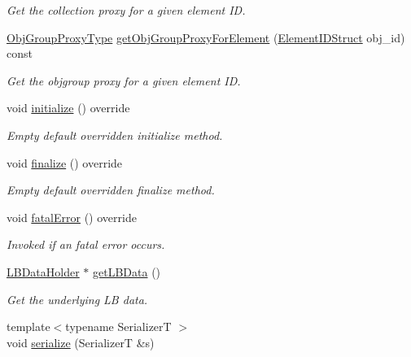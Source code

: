 \begin{DoxyCompactItemize}
\begin{DoxyCompactList}\small\item\em Get the collection proxy for a given element ID. \end{DoxyCompactList}\item 
\hyperlink{namespacevt_ad7cae989df485fccca57f0792a880a8e}{Obj\+Group\+Proxy\+Type} \hyperlink{structvt_1_1vrt_1_1collection_1_1balance_1_1_node_l_b_data_a1f410baa1f6a5088a814fdcda87ff6d4}{get\+Obj\+Group\+Proxy\+For\+Element} (\hyperlink{namespacevt_1_1vrt_1_1collection_1_1balance_a9f5b53fafb270212279a4757d2c4cd28}{Element\+I\+D\+Struct} obj\+\_\+id) const
\begin{DoxyCompactList}\small\item\em Get the objgroup proxy for a given element ID. \end{DoxyCompactList}\item 
void \hyperlink{structvt_1_1vrt_1_1collection_1_1balance_1_1_node_l_b_data_aa489e1252abac8237d30bb0110ad36f9}{initialize} () override
\begin{DoxyCompactList}\small\item\em Empty default overridden initialize method. \end{DoxyCompactList}\item 
void \hyperlink{structvt_1_1vrt_1_1collection_1_1balance_1_1_node_l_b_data_ac62cac77080f79e73e303c42ad850155}{finalize} () override
\begin{DoxyCompactList}\small\item\em Empty default overridden finalize method. \end{DoxyCompactList}\item 
void \hyperlink{structvt_1_1vrt_1_1collection_1_1balance_1_1_node_l_b_data_aefbc8058f2d74c3dd6c903e9bfefe0d2}{fatal\+Error} () override
\begin{DoxyCompactList}\small\item\em Invoked if an fatal error occurs. \end{DoxyCompactList}\item 
\hyperlink{structvt_1_1vrt_1_1collection_1_1balance_1_1_l_b_data_holder}{L\+B\+Data\+Holder} $\ast$ \hyperlink{structvt_1_1vrt_1_1collection_1_1balance_1_1_node_l_b_data_aa67707482afa83dfa96910ac42337ef0}{get\+L\+B\+Data} ()
\begin{DoxyCompactList}\small\item\em Get the underlying LB data. \end{DoxyCompactList}\item 
{\footnotesize template$<$typename SerializerT $>$ }\\void \hyperlink{structvt_1_1vrt_1_1collection_1_1balance_1_1_node_l_b_data_aa6b20e4b1920e9294fb8b933dcd8a35b}{serialize} (SerializerT \&s)
\end{DoxyCompactItemize}
